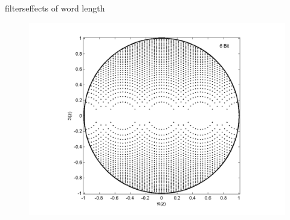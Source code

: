 \begin{frame}{filters}{effects of word length}
{\begin{figure}[!hbt]
\begin{center}
						\includegraphics[scale=.35]{graph/QuantPolePlotDirect_2}
					\end{center}
				\end{figure}
			}
\end{frame}
